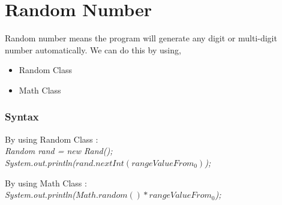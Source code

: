 \documentclass[openany]{book}  %
\begin{document}
\section{Random Number}
Random number means the program will generate any digit or multi-digit
number automatically. We can do this by using,
\begin{itemize}
    \item Random Class
    \item Math Class
\end{itemize}
% 
% 
\subsubsection{Syntax}
\begin{center}
    \tt{
        \raggedright{By using Random Class : }\\
        \textit{
            Random rand = new Rand();\\
            System.out.println($rand.nextInt(rangeValueFrom_0)$);\\
        }
        \vskip 0.5cm
        \raggedright{By using Math Class : }\\
        \textit{
            System.out.println($Math.random()*rangeValueFrom_0$);\\
        }
    }
\end{center}

\newpage

% 
% 
\end{document}
